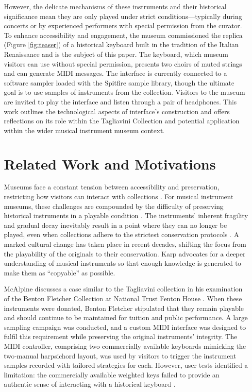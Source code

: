 However, the delicate mechanisms of these instruments and their historical significance mean they are only played under strict conditions—typically during concerts or by experienced performers with special permission from the curator. 
To enhance accessibility and engagement, the museum commissioned the replica (Figure \ref{fig:teaser}) of a historical keyboard built in the tradition of the Italian Renaissance and is the subject of this paper.
The keyboard, which museum visitors can use without special permission, presents two choirs of muted strings and can generate MIDI messages. The interface is currently connected to a software sampler loaded with the Spitfire sample library, though the ultimate goal is to use samples of instruments from the collection. Visitors to the museum are invited to play the interface and listen through a pair of headphones. This work outlines the technological aspects of interface's construction and offers reflections on its role within the Tagliavini Collection and potential application within the wider musical instrument museum context. 


\section{Related Work and Motivations}\label{related-work}


Museums face a constant tension between accessibility and preservation, restricting how visitors can interact with collections \cite{Templeton2018, McAlpine2014}. For musical instrument museums, these challenges are compounded by the difficulty of preserving historical instruments in a playable condition \cite{McAlpine2014}. The instruments' inherent fragility and gradual decay inevitably result in a point where they can no longer be played, even when collections adhere to the strictest conservation protocols \cite{NYT_strad}. A marked cultural change has taken place in recent decades, shifting the focus from the playability of the originals to their conservation. Karp \cite{Karp1979,Karp1985} advocates for a deeper understanding of musical instruments so that enough knowledge is generated to make them as ``copyable'' as possible.

McAlpine discusses a case similar to the Tagliavini collection in his examination of the Benton Fletcher Collection at National Trust Fenton House \cite{McAlpine2014}. When these instruments were donated, Benton Fletcher stipulated that they remain playable and should continue to be maintained for tuition and public performance. A large sampling campaign was conducted, and a custom MIDI interface was designed to fulfil this requirement while preserving the original instruments' integrity. The MIDI controller, comprising two commercially available keyboards mimicking the two-manual harpsichord layout, was used by visitors to trigger the instrument samples recorded with tailored strategies for each. However, user tests identified a limitation: the commercially available weighted keys failed to provide an authentic sense of interacting with a historical keyboard \cite{McAlpine2014}. 

